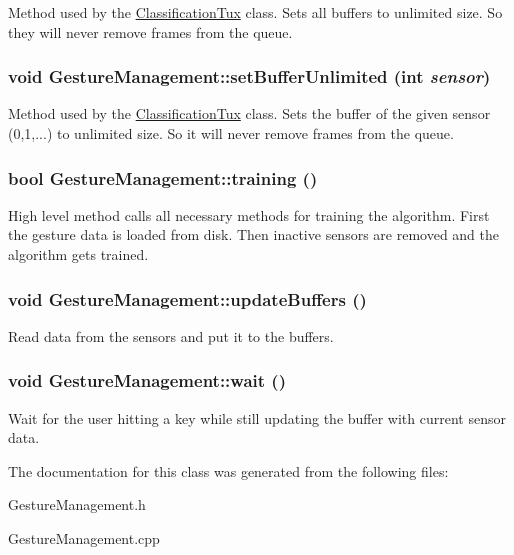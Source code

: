 \label{classGestureManagement_af9bbed6b1b9f4dca4923abbe86aab41b}
Method used by the \hyperlink{classClassificationTux}{ClassificationTux} class. Sets all buffers to unlimited size. So they will never remove frames from the queue. \hypertarget{classGestureManagement_a3921a36bd1df37564eeae05f3b481b6b}{
\subsubsection[{setBufferUnlimited}]{\setlength{\rightskip}{0pt plus 5cm}void GestureManagement::setBufferUnlimited (int {\em sensor})}}
\label{classGestureManagement_a3921a36bd1df37564eeae05f3b481b6b}
Method used by the \hyperlink{classClassificationTux}{ClassificationTux} class. Sets the buffer of the given sensor (0,1,...) to unlimited size. So it will never remove frames from the queue. \hypertarget{classGestureManagement_a7457d89ad122f30c74830cc237ba0677}{
\subsubsection[{training}]{\setlength{\rightskip}{0pt plus 5cm}bool GestureManagement::training ()}}
\label{classGestureManagement_a7457d89ad122f30c74830cc237ba0677}
High level method calls all necessary methods for training the algorithm. First the gesture data is loaded from disk. Then inactive sensors are removed and the algorithm gets trained. \hypertarget{classGestureManagement_aab8a8955b83bf07a872c458c2364d8fd}{
\subsubsection[{updateBuffers}]{\setlength{\rightskip}{0pt plus 5cm}void GestureManagement::updateBuffers ()}}
\label{classGestureManagement_aab8a8955b83bf07a872c458c2364d8fd}
Read data from the sensors and put it to the buffers. \hypertarget{classGestureManagement_a618ae355936c297079a3da77ee83f82f}{
\subsubsection[{wait}]{\setlength{\rightskip}{0pt plus 5cm}void GestureManagement::wait ()}}
\label{classGestureManagement_a618ae355936c297079a3da77ee83f82f}
Wait for the user hitting a key while still updating the buffer with current sensor data. 

The documentation for this class was generated from the following files:\begin{DoxyCompactItemize}
\item 
GestureManagement.h\item 
GestureManagement.cpp\end{DoxyCompactItemize}
